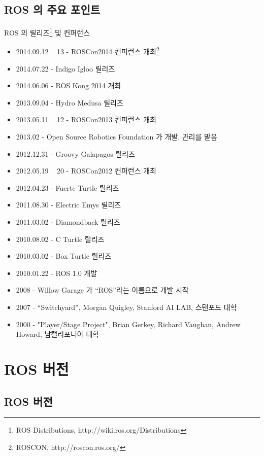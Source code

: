 \subsection{ROS 의 주요 포인트}

ROS 의 릴리즈\footnote{ROS Distributions, http://wiki.ros.org/Distributions} 및 컨퍼런스

\begin{itemize}
\item 2014.09.12 ~ 13 - ROSCon2014 컨퍼런스 개최\footnote{ROSCON, http://roscon.ros.org/}
\item 2014.07.22 - Indigo Igloo 릴리즈
\item 2014.06.06 - ROS Kong 2014 개최
\item 2013.09.04 - Hydro Medusa 릴리즈
\item 2013.05.11 ~ 12 - ROSCon2013 컨퍼런스 개최
\item 2013.02 - Open Source Robotics Foundation 가 개발, 관리를 맡음
\item 2012.12.31 - Groovy Galapagos 릴리즈
\item 2012.05.19 ~ 20 - ROSCon2012 컨퍼런스 개최
\item 2012.04.23 - Fuerte Turtle 릴리즈
\item 2011.08.30 - Electric Emys 릴리즈
\item 2011.03.02 - Diamondback 릴리즈
\item 2010.08.02 - C Turtle 릴리즈
\item 2010.03.02 - Box Turtle 릴리즈
\item 2010.01.22 - ROS 1.0 개발
\item 2008 - Willow Garage 가 “ROS”라는 이름으로 개발 시작
\item 2007 - “Switchyard”, Morgan Quigley, Stanford AI LAB, 스탠포드 대학
\item 2000 - "Player/Stage Project", Brian Gerkey, Richard Vaughan, Andrew Howard, 남캘리포니아 대학
\end{itemize}


\section{ROS 버전}

\subsection{ROS 버전}

